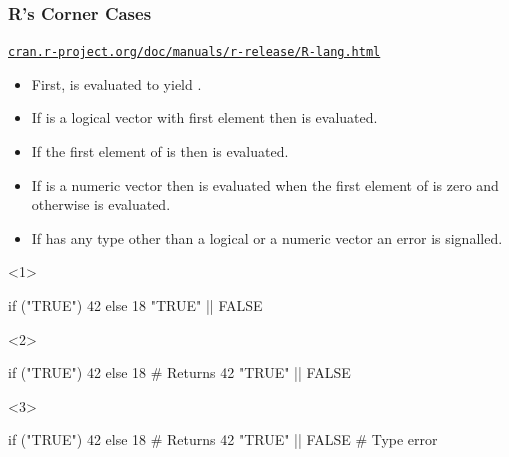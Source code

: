 \documentclass{beamer}
\begin{document}
\begin{frame}[fragile]
  \frametitle{R’s Corner Cases}

  \begin{block}{%
    \href{https://cran.r-project.org/doc/manuals/r-release/R-lang.html\#if}%
    {\nolinkurl{cran.r-project.org/doc/manuals/r-release/R-lang.html}}}


  \begin{itemize}
    \item First,  is evaluated to yield .
    \item If  is a logical vector with first element 
      then  is evaluated.
    \item If the first element of  is 
      then  is evaluated.
    \item If  is a numeric vector then  is evaluated
      when the first element of  is zero and otherwise  is evaluated.
    \item If  has any type other than a logical or a numeric vector
      an error is signalled.
  \end{itemize}

  \end{block}

\begin{overlayarea}{\textwidth}{15mm}
  \begin{onlyenv}<1>
\begin{Rcode}
if ("TRUE") 42 else 18
"TRUE" || FALSE
\end{Rcode}
  \end{onlyenv}
  \begin{onlyenv}<2>
\begin{Rcode}
if ("TRUE") 42 else 18    # Returns 42
"TRUE" || FALSE
\end{Rcode}
  \end{onlyenv}
  \begin{onlyenv}<3>
\begin{Rcode}
if ("TRUE") 42 else 18    # Returns 42
"TRUE" || FALSE           # Type error
\end{Rcode}
  \end{onlyenv}
\end{overlayarea}

\end{frame}
\end{document}
